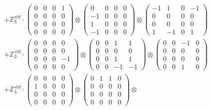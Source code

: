 \documentclass{article}
\begin{document}
{\begin{align}
        &+ \label{Rs16-Rc11-Solution-21-c22} \mathbb{Z}_3^{std} \cdot 
            \begin{pmatrix} 0 & 0 & 0 & 1 \\ 0 & 0 & 0 & 0 \\ 0 & 0 & 0 & 0 \\ 0 & 0 & 0 & 0 \end{pmatrix} \otimes 
            \begin{pmatrix} 0 & 0 & 0 & 0 \\ -1 & 0 & 0 & 0 \\ 1 & 0 & 0 & 0 \\ -1 & 0 & 0 & 0 \end{pmatrix} \otimes 
            \begin{pmatrix} -1 & 1 & 0 & -1 \\ 0 & 0 & 0 & 0 \\ 0 & 0 & 0 & 0 \\ 1 & -1 & 0 & 1 \end{pmatrix} \\ 
        &+ \label{Rs16-Rc11-Solution-21-c23} \mathbb{Z}_3^{std} \cdot 
            \begin{pmatrix} 0 & 0 & 0 & 0 \\ 0 & 0 & 0 & 0 \\ 0 & 0 & 0 & -1 \\ 0 & 0 & 0 & 0 \end{pmatrix} \otimes 
            \begin{pmatrix} 0 & 0 & 1 & 1 \\ 0 & 0 & 0 & 0 \\ 0 & 0 & 1 & 1 \\ 0 & 0 & -1 & -1 \end{pmatrix} \otimes 
            \begin{pmatrix} 0 & 0 & -1 & 0 \\ 0 & 0 & 0 & 0 \\ 0 & 0 & 0 & 0 \\ 0 & 0 & 1 & 0 \end{pmatrix} \\ 
        &+ \label{Rs16-Rc11-Solution-21-c24} \mathbb{Z}_3^{std} \cdot 
            \begin{pmatrix} 0 & 0 & 0 & 0 \\ 1 & 0 & 0 & 0 \\ 0 & 0 & 0 & 0 \\ 0 & 0 & 0 & 0 \end{pmatrix} \otimes 
            \begin{pmatrix} 0 & 1 & 1 & 0 \\ 0 & 0 & 0 & 0 \\ 0 & 0 & 0 & 0 \\ 0 & 0 & 0 & 0 \end{pmatrix} \otimes 

\end{align}}
\end{document}
